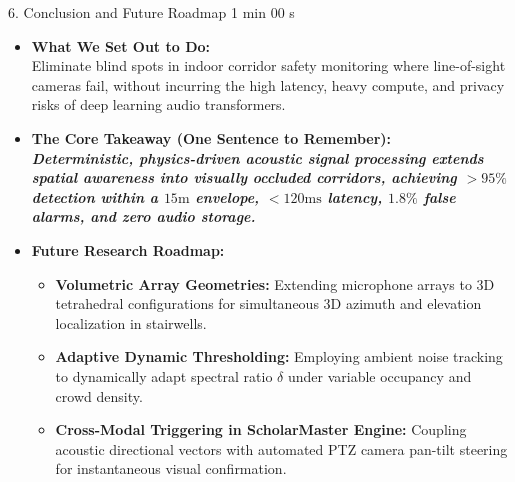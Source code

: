 \documentclass[aspectratio=169,10pt]{beamer}
\begin{document}
\begin{frame}{6. Conclusion and Future Roadmap \hfill {\small\color{gray}1 min 00 s}}
\begin{itemize}
    \setlength{\itemsep}{0.8em}
    \item \textbf{What We Set Out to Do:} \\
    Eliminate blind spots in indoor corridor safety monitoring where line-of-sight cameras fail, without incurring the high latency, heavy compute, and privacy risks of deep learning audio transformers.
    
    \item \textbf{The Core Takeaway (One Sentence to Remember):} \\
    \textit{\textbf{Deterministic, physics-driven acoustic signal processing extends spatial awareness into visually occluded corridors, achieving $>95\%$ detection within a $15\text{m}$ envelope, $<120\text{ms}$ latency, $1.8\%$ false alarms, and zero audio storage.}}
    
    \item \textbf{Future Research Roadmap:}
    \begin{itemize}
        \item \textbf{Volumetric Array Geometries:} Extending microphone arrays to 3D tetrahedral configurations for simultaneous 3D azimuth and elevation localization in stairwells.
        \item \textbf{Adaptive Dynamic Thresholding:} Employing ambient noise tracking to dynamically adapt spectral ratio $\delta$ under variable occupancy and crowd density.
        \item \textbf{Cross-Modal Triggering in ScholarMaster Engine:} Coupling acoustic directional vectors with automated PTZ camera pan-tilt steering for instantaneous visual confirmation.
    \end{itemize}
\end{itemize}
\end{frame}
\end{document}
